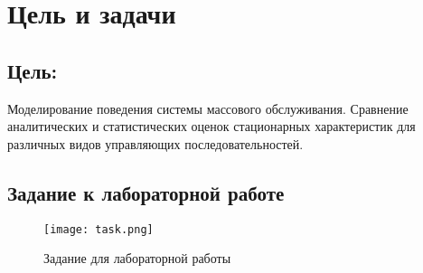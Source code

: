 \chapter{Цель и задачи}
\label{ch:intro}

\section*{\textbf{Цель:}} 

Моделирование поведения системы массового
обслуживания. Сравнение аналитических и статистических оценок
стационарных характеристик для различных видов управляющих
последовательностей.

\section*{Задание к лабораторной работе}

\begin{figure}[H]
    \centering
    \texttt{[image: task.png]}
    \caption{Задание для лабораторной работы}
\end{figure}


\endinput
